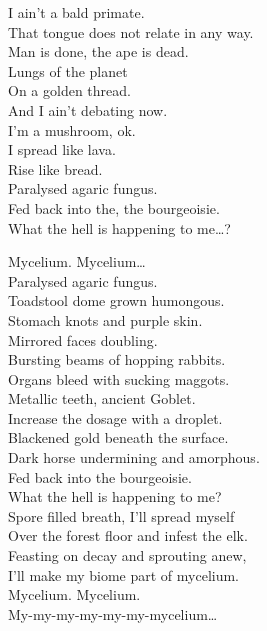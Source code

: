I ain't a bald primate. \\
That tongue does not relate in any way. \\
Man is done, the ape is dead. \\
Lungs of the planet \\
On a golden thread. \\
And I ain't debating now. \\
I'm a mushroom, ok. \\
I spread like lava. \\
Rise like bread. \\
Paralysed agaric fungus. \\

Fed back into the, the bourgeoisie. \\
What the hell is happening to me…? \\


Mycelium. Mycelium… \\

Paralysed agaric fungus. \\
Toadstool dome grown humongous. \\
Stomach knots and purple skin. \\
Mirrored faces doubling. \\
Bursting beams of hopping rabbits. \\
Organs bleed with sucking maggots. \\
Metallic teeth, ancient Goblet. \\
Increase the dosage with a droplet. \\
Blackened gold beneath the surface. \\
Dark horse undermining and amorphous. \\

Fed back into the bourgeoisie. \\
What the hell is happening to me? \\

Spore filled breath, I'll spread myself \\
Over the forest floor and infest the elk. \\
Feasting on decay and sprouting anew, \\
I'll make my biome part of mycelium. \\

Mycelium. Mycelium. \\
My-my-my-my-my-my-mycelium… \\

